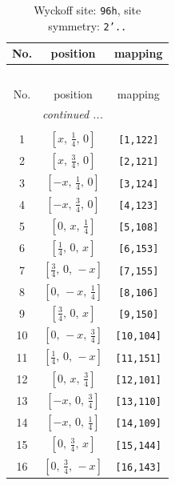\documentclass[fleqn,8pt]{jsarticle}
\begin{document}
\begin{longtable}{ccc}
\caption{Wyckoff site: {\tt 96h}, site symmetry: {\tt 2'..}}
 \\
 \hline \hline
No. & position & mapping \\ \hline \endfirsthead

\multicolumn{2}{l}{\tablename\ \thetable{}} \\
 \hline \hline
No. & position & mapping \\ \hline \endhead

 \hline \hline
\multicolumn{2}{r}{\footnotesize\it continued ...} \\ \endfoot

 \hline \hline
\multicolumn{2}{r}{} \\ \endlastfoot

1 & $\left[ x,\, \frac{1}{4},\, 0 \right]$ & {\tt [1,122]} \\ \hline
2 & $\left[ x,\, \frac{3}{4},\, 0 \right]$ & {\tt [2,121]} \\ \hline
3 & $\left[ - x,\, \frac{1}{4},\, 0 \right]$ & {\tt [3,124]} \\ \hline
4 & $\left[ - x,\, \frac{3}{4},\, 0 \right]$ & {\tt [4,123]} \\ \hline
5 & $\left[ 0,\, x,\, \frac{1}{4} \right]$ & {\tt [5,108]} \\ \hline
6 & $\left[ \frac{1}{4},\, 0,\, x \right]$ & {\tt [6,153]} \\ \hline
7 & $\left[ \frac{3}{4},\, 0,\, - x \right]$ & {\tt [7,155]} \\ \hline
8 & $\left[ 0,\, - x,\, \frac{1}{4} \right]$ & {\tt [8,106]} \\ \hline
9 & $\left[ \frac{3}{4},\, 0,\, x \right]$ & {\tt [9,150]} \\ \hline
10 & $\left[ 0,\, - x,\, \frac{3}{4} \right]$ & {\tt [10,104]} \\ \hline
11 & $\left[ \frac{1}{4},\, 0,\, - x \right]$ & {\tt [11,151]} \\ \hline
12 & $\left[ 0,\, x,\, \frac{3}{4} \right]$ & {\tt [12,101]} \\ \hline
13 & $\left[ - x,\, 0,\, \frac{3}{4} \right]$ & {\tt [13,110]} \\ \hline
14 & $\left[ - x,\, 0,\, \frac{1}{4} \right]$ & {\tt [14,109]} \\ \hline
15 & $\left[ 0,\, \frac{3}{4},\, x \right]$ & {\tt [15,144]} \\ \hline
16 & $\left[ 0,\, \frac{3}{4},\, - x \right]$ & {\tt [16,143]} \\ \hline

\end{longtable}
\end{document}
